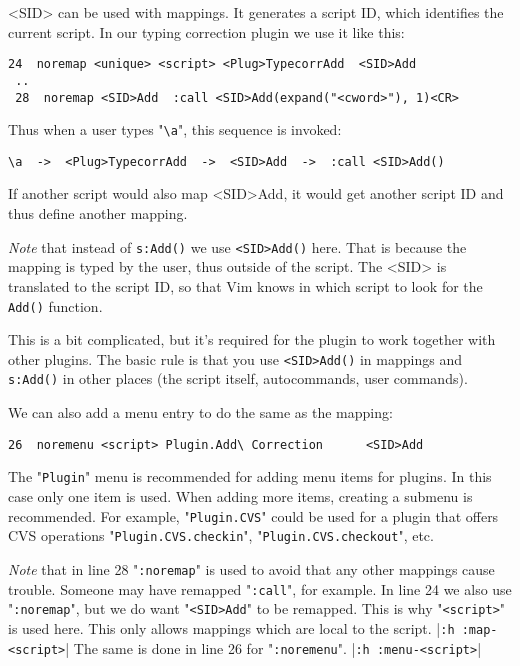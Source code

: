 <SID> can be used with mappings.
It generates a script ID, which identifies the current script.
In our typing correction plugin we use it like this:

\begin{Verbatim}[samepage=true]
 24  noremap <unique> <script> <Plug>TypecorrAdd  <SID>Add
 ..
 28  noremap <SID>Add  :call <SID>Add(expand("<cword>"), 1)<CR>
\end{Verbatim}

Thus when a user types "\verb!\a!", this sequence is invoked:

\begin{Verbatim}[samepage=true]
 \a  ->  <Plug>TypecorrAdd  ->  <SID>Add  ->  :call <SID>Add()
\end{Verbatim}

If another script would also map <SID>Add, it would get another script ID and thus define another mapping.

\emph{Note} that instead of \verb!s:Add()! we use \verb!<SID>Add()! here.
That is because the mapping is typed by the user, thus outside of the script.
The <SID> is translated to the script ID, so that Vim knows in which script to look for the \verb!Add()! function.

This is a bit complicated, but it's required for the plugin to work together with other plugins.
The basic rule is that you use \verb!<SID>Add()! in mappings and \verb!s:Add()! in other places (the script itself, autocommands, user commands).

We can also add a menu entry to do the same as the mapping:

\begin{Verbatim}[samepage=true]
 26  noremenu <script> Plugin.Add\ Correction      <SID>Add
\end{Verbatim}

The "\verb!Plugin!" menu is recommended for adding menu items for plugins.
In this case only one item is used.
When adding more items, creating a submenu is recommended.
For example, "\verb!Plugin.CVS!" could be used for a plugin that offers CVS operations "\verb!Plugin.CVS.checkin!", "\verb!Plugin.CVS.checkout!", etc.

\emph{Note} that in line 28 "\verb!:noremap!" is used to avoid that any other mappings cause trouble.
Someone may have remapped "\verb!:call!", for example.
In line 24 we also use "\verb!:noremap!", but we do want "\verb!<SID>Add!" to be remapped.
This is why "\verb!<script>!" is used here.
This only allows mappings which are local to the script. |\verb!:h :map-<script>!|
The same is done in line 26 for "\verb!:noremenu!".
|\verb!:h :menu-<script>!|

